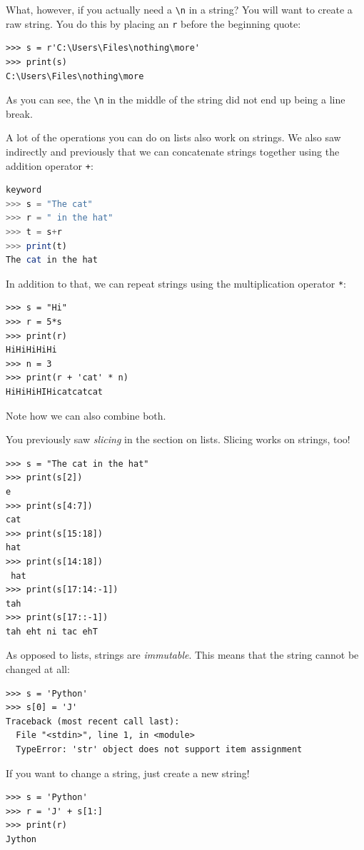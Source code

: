 \documentclass[11pt]{cselabheader}
\begin{document}
What, however, if you actually need a \lstinline!\n! in a string? You will want
to create a raw string. You do this by placing an \lstinline!r! before the
beginning quote:
\begin{lstlisting}[style=ipython]
>>> s = r'C:\Users\Files\nothing\more'
>>> print(s)
C:\Users\Files\nothing\more
\end{lstlisting}

As you can see, the \lstinline!\n! in the middle of the string did not end up
being a line break.

A lot of the operations you can do on lists also work on strings. We also saw
indirectly and previously that we can concatenate strings together using the
addition operator \lstinline!+!:
\begin{lstlisting}[style=ipython,language=Octave] % octave doesn't have in
keyword
>>> s = "The cat"
>>> r = " in the hat"
>>> t = s+r
>>> print(t)
The cat in the hat
\end{lstlisting}

In addition to that, we can repeat strings using the multiplication operator
\lstinline!*!:
\begin{lstlisting}[style=ipython]
>>> s = "Hi"
>>> r = 5*s
>>> print(r)
HiHiHiHiHi
>>> n = 3
>>> print(r + 'cat' * n)
HiHiHiHIHicatcatcat
\end{lstlisting}
Note how we can also combine both.

You previously saw \emph{slicing} in the section on lists. Slicing works on strings, too!
\begin{lstlisting}[style=ipython]
>>> s = "The cat in the hat"
>>> print(s[2])
e
>>> print(s[4:7])
cat
>>> print(s[15:18])
hat
>>> print(s[14:18])
 hat
>>> print(s[17:14:-1])
tah
>>> print(s[17::-1])
tah eht ni tac ehT
\end{lstlisting}

As opposed to lists, strings are \emph{immutable}. This means that the string
cannot be changed at all:
\begin{lstlisting}[style=ipython]
>>> s = 'Python'
>>> s[0] = 'J'
Traceback (most recent call last):
  File "<stdin>", line 1, in <module>
  TypeError: 'str' object does not support item assignment
\end{lstlisting}

If you want to change a string, just create a new string!
\begin{lstlisting}[style=ipython]
>>> s = 'Python'
>>> r = 'J' + s[1:]
>>> print(r)
Jython
\end{lstlisting}
\end{document}
